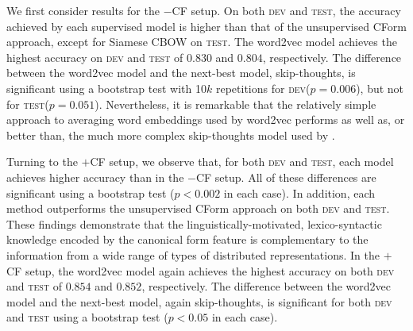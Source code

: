 \documentclass[11pt,a4paper]{article}
\newcommand{\secref}[1]{Section~\ref{#1}}
\newcommand{\tabref}[1]{Table~\ref{#1}}
\newcommand{\dev}{\textsc{dev}\xspace}
\newcommand{\test}{\textsc{test}\xspace}
\begin{document}
We first consider results for the $-$CF setup. On both \dev and \test,
the accuracy achieved by each supervised model is higher than that of
the unsupervised CForm approach, except for Siamese CBOW on \test. The
word2vec model achieves the highest accuracy on \dev and \test of
$0.830$ and $0.804$, respectively. The difference between the word2vec
model and the next-best model, skip-thoughts, is significant using a
bootstrap test \cite{Berg-Kirkpatrick+:2012} with 10$k$ repetitions
for \dev ($p=0.006$), but not for \test ($p=0.051$). Nevertheless, it
is remarkable that the relatively simple approach to averaging word
embeddings used by word2vec performs as well as, or better than, the
much more complex skip-thoughts model used by
.

Turning to the $+$CF setup, we observe that, for both \dev and \test,
each model achieves higher accuracy than in the $-$CF setup. All of
these differences are significant using a bootstrap test ($p<0.002$ in
each case). In addition, each method outperforms the unsupervised
CForm approach on both \dev and \test. These findings demonstrate that
the linguistically-motivated, lexico-syntactic knowledge encoded by
the canonical form feature is complementary to the information from a
wide range of types of distributed representations. In the $+$CF
setup, the word2vec model again achieves the highest accuracy on both
\dev and \test of $0.854$ and $0.852$, respectively. The difference
between the word2vec model and the next-best model, again
skip-thoughts, is significant for both \dev and \test using a
bootstrap test ($p<0.05$ in each case).



\end{document}
